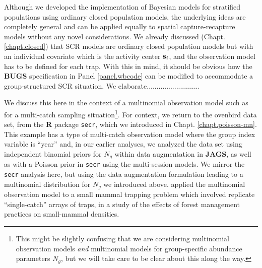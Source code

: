 Although we developed the implementation of Bayesian models for
stratified populations using ordinary closed population models, the
underlying ideas are completely general and can be applied equally to
spatial capture-recapture models without any novel considerations.
We already discussed (Chapt. \ref{chapt.closed}) 
that SCR models are ordinary closed population models
but with an individual covariate which is the 
activity center ${\bf s}_{i}$, and the observation model has to be
defined for each trap. With this in mind, it should be obvious how the
{\bf BUGS} specification in Panel \ref{panel.wbcode} can be modified
to accommodate a group-structured SCR situation. 
We elaborate...........................

We discuss this here in the context of a multinomial observation model
such as for a multi-catch sampling situation\footnote{This might be
  slightly confusing that we are considering multinomial observation
  models {\it and} multinomial models for group-specific abundance
  parameters $N_{g}$, but we will take care to be clear about this
  along the way.}.
For context, we return to the
ovenbird data set, from the {\bf R} package \mbox{\tt secr}, which we
introduced in Chapt. \ref{chapt.poisson-mn}. This example has a type
of multi-catch observation model where the group index variable is
``year'' and, in our earlier analyses, we analyzed the data set using
independent binomial priors for $N_{g}$ within data augmentation in
{\bf JAGS}, as well as with a Poisson prior in \mbox{\tt secr} using
the multi-session models.  We mirror the \mbox{\tt secr} analysis
here, but using the data augmentation formulation leading to a
multinomial distribution for $N_{g}$ we introduced above.
\citet{royle_converse:2013} applied the multinomial observation model to a small mammal
trapping problem which involved replicate ``single-catch'' arrays of
traps, in a study of the effects of forest management practices on
small-mammal densities.

